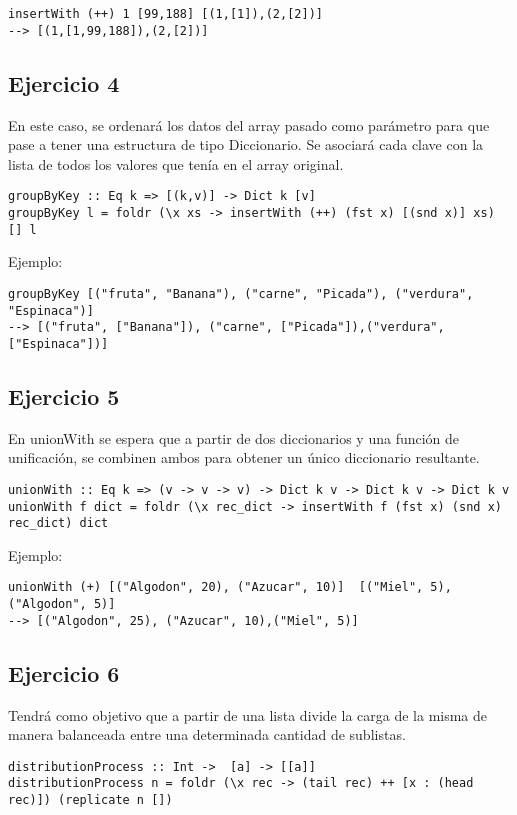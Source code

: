 \documentclass[10pt, a4paper,english,spanish,hidelinks]{article}
\begin{document}
\begin{verbatim}
insertWith (++) 1 [99,188] [(1,[1]),(2,[2])]
--> [(1,[1,99,188]),(2,[2])]
\end{verbatim}

\subsection{Ejercicio 4}
En este caso, se ordenará los datos del array pasado como parámetro para que pase a tener una estructura de tipo Diccionario. Se asociará cada clave con la lista de todos los valores que tenía en el array original.
\begin{verbatim}
groupByKey :: Eq k => [(k,v)] -> Dict k [v]
groupByKey l = foldr (\x xs -> insertWith (++) (fst x) [(snd x)] xs) [] l
\end{verbatim}
Ejemplo:
\begin{verbatim}
groupByKey [("fruta", "Banana"), ("carne", "Picada"), ("verdura", "Espinaca")]
--> [("fruta", ["Banana"]), ("carne", ["Picada"]),("verdura", ["Espinaca"])]
\end{verbatim}




\subsection{Ejercicio 5}
En unionWith se espera que a partir de dos diccionarios y una función de unificación, se combinen ambos para obtener un único diccionario resultante.
\begin{verbatim}
unionWith :: Eq k => (v -> v -> v) -> Dict k v -> Dict k v -> Dict k v
unionWith f dict = foldr (\x rec_dict -> insertWith f (fst x) (snd x) rec_dict) dict
\end{verbatim}
Ejemplo:
\begin{verbatim}
unionWith (+) [("Algodon", 20), ("Azucar", 10)]  [("Miel", 5),("Algodon", 5)]
--> [("Algodon", 25), ("Azucar", 10),("Miel", 5)]
\end{verbatim}


\subsection{Ejercicio 6}
Tendrá como objetivo que a partir de una lista divide la carga de la misma de manera balanceada entre una determinada cantidad de sublistas. 

\begin{verbatim}
distributionProcess :: Int ->  [a] -> [[a]]
distributionProcess n = foldr (\x rec -> (tail rec) ++ [x : (head rec)]) (replicate n [])
\end{verbatim}
\end{document}
